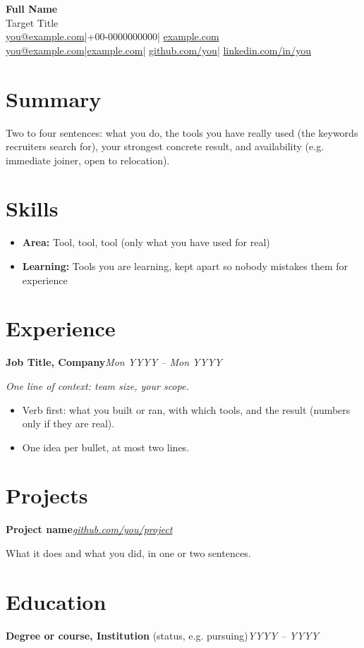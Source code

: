 \documentclass[10pt,a4paper]{article}
\newcommand{\role}[3]{\textbf{#1}\hfill\textit{#2}\par\textit{#3}\par}
\newcommand{\project}[2]{\textbf{#1}\hfill\textit{#2}\par}
\newcommand{\sep}{\hspace{8.3pt}|\hspace{5pt}}
\begin{document}
\begin{center}
  {\fontsize{24}{28}\selectfont\bfseries Full Name}\\[1.1ex]
  {\large Target Title}\\[0.9ex]
  \ifdefined\withphone
    \href{mailto:you@example.com}{you@example.com}\sep +00-0000000000\sep
    \href{https://example.com}{example.com}\\
  \else
    \href{mailto:you@example.com}{you@example.com}\sep \href{https://example.com}{example.com}\sep
  \fi
  \href{https://github.com/you}{github.com/you}\sep
  \href{https://www.linkedin.com/in/you}{linkedin.com/in/you}
\end{center}
\vspace{-2.3ex}

\section*{Summary}
Two to four sentences: what you do, the tools you have really used (the keywords recruiters search for), your strongest concrete result, and availability (e.g. immediate joiner, open to relocation).

\section*{Skills}
\begin{itemize}[label={},leftmargin=1.2em,itemsep=3pt]
  \item \textbf{Area:} Tool, tool, tool (only what you have used for real)
  \item \textbf{Learning:} Tools you are learning, kept apart so nobody mistakes them for experience
\end{itemize}

\section*{Experience}
\role{Job Title, Company}{Mon YYYY -- Mon YYYY}{One line of context: team size, your scope.}
\begin{itemize}
  \item Verb first: what you built or ran, with which tools, and the result (numbers only if they are real).
  \item One idea per bullet, at most two lines.
\end{itemize}

\section*{Projects}
\project{Project name}{\href{https://github.com/you/project}{github.com/you/project}}
What it does and what you did, in one or two sentences.

\section*{Education}
\textbf{Degree or course, Institution} (status, e.g. pursuing)\hfill\textit{YYYY -- YYYY}
\end{document}
